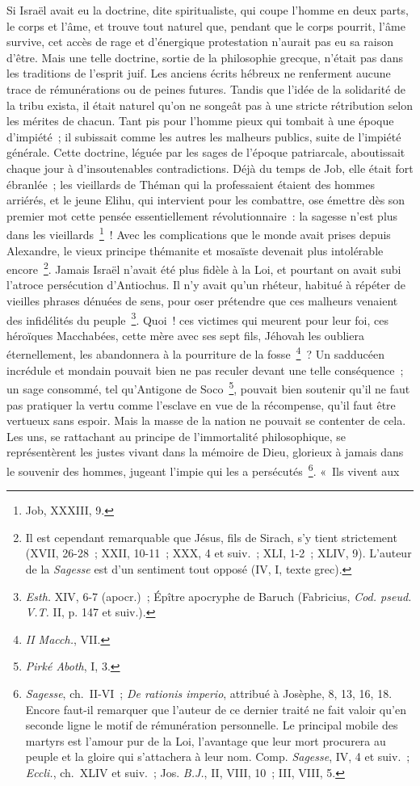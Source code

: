 \documentclass[french,twoside]{book} %
\begin{document}
Si Israël avait eu la doctrine, dite spiritualiste, qui coupe l’homme en deux parts, le corps et l’âme, et trouve tout naturel que, pendant que le corps pourrit, l’âme survive, cet accès de rage et d’énergique protestation n’aurait pas eu sa raison d’être. Mais une telle doctrine, sortie de la philosophie grecque, n’était pas dans les traditions de l’esprit juif. Les anciens écrits hébreux ne renferment aucune trace de rémunérations ou de peines futures. Tandis que l’idée de la solidarité de la tribu exista, il était naturel qu’on ne songeât pas à une stricte rétribution selon les mérites de chacun. Tant pis pour l’homme pieux qui tombait à une époque d’impiété ; il subissait comme les autres les malheurs publics, suite de l’impiété générale. Cette doctrine, léguée par les sages de l’époque patriarcale, aboutissait chaque jour à d’insoutenables contradictions. Déjà du temps de Job, elle était fort ébranlée ; les vieillards de Théman qui la professaient étaient des hommes arriérés, et le jeune Elihu, qui intervient pour les combattre, ose émettre dès son premier mot cette pensée essentiellement révolutionnaire : la sagesse n’est plus dans les vieillards \footnote{Job, XXXIII, 9.} ! Avec les complications que le monde avait prises depuis Alexandre, le vieux principe thémanite et mosaïste devenait plus intolérable encore \footnote{ Il est cependant remarquable que Jésus, fils de Sirach, s’y tient strictement (XVII, 26-28 ; XXII, 10-11 ; XXX, 4 et suiv. ; XLI, 1-2 ; XLIV, 9). L’auteur de la {\itshape Sagesse} est d’un sentiment tout opposé (IV, I, texte grec).}. Jamais Israël n’avait été plus fidèle à la Loi, et pourtant on avait subi l’atroce persécution d’Antiochus. Il n’y avait qu’un rhéteur, habitué à répéter de vieilles phrases dénuées de sens, pour oser prétendre que ces malheurs venaient des infidélités du peuple \footnote{{\itshape Esth.} XIV, 6-7 (apocr.) ; Épître apocryphe de Baruch (Fabricius, {\itshape Cod. pseud. V.T.} II, p. 147 et suiv.).}. Quoi ! ces victimes qui meurent pour leur foi, ces héroïques Macchabées, cette mère avec ses sept fils, Jéhovah les oubliera éternellement, les abandonnera à la pourriture de la fosse \footnote{{\itshape II Macch.}, VII.} ? Un sadducéen incrédule et mondain pouvait bien ne pas reculer devant une telle conséquence ; un sage consommé, tel qu’Antigone de Soco \footnote{{\itshape Pirké Aboth}, I, 3.}, pouvait bien soutenir qu’il ne faut pas pratiquer la vertu comme l’esclave en vue de la récompense, qu’il faut être vertueux sans espoir. Mais la masse de la nation ne pouvait se contenter de cela. Les uns, se rattachant au principe de l’immortalité philosophique, se représentèrent les justes vivant dans la mémoire de Dieu, glorieux à jamais dans le souvenir des hommes, jugeant l’impie qui les a persécutés \footnote{{\itshape Sagesse}, ch. II-VI ; {\itshape De rationis imperio}, attribué à Josèphe, 8, 13, 16, 18. Encore faut-il remarquer que l’auteur de ce dernier traité ne fait valoir qu’en seconde ligne le motif de rémunération personnelle. Le principal mobile des martyrs est l’amour pur de la Loi, l’avantage que leur mort procurera au peuple et la gloire qui s’attachera à leur nom. Comp. {\itshape Sagesse}, IV, 4 et suiv. ; {\itshape Eccli.}, ch. XLIV et suiv. ; Jos. {\itshape B.J.}, II, VIII, 10 ; III, VIII, 5.}. « Ils vivent aux 
\end{document}
